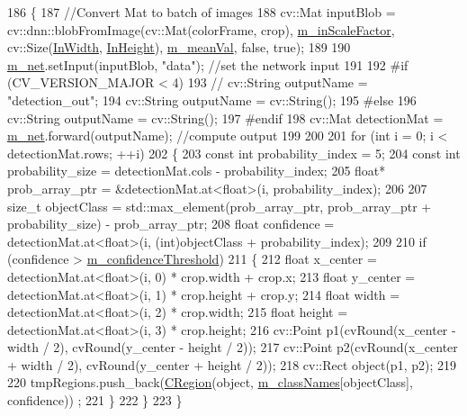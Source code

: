 \begin{DoxyCode}
186 \{
187     \textcolor{comment}{//Convert Mat to batch of images}
188     cv::Mat inputBlob = cv::dnn::blobFromImage(cv::Mat(colorFrame, crop), 
      \mbox{\hyperlink{class_yolo_detector_afc6432eab72fdf319af7f48753ecbcd1}{m\_inScaleFactor}}, cv::Size(\mbox{\hyperlink{class_yolo_detector_a01461f7ada4da3e8027d805f7129bab4}{InWidth}}, \mbox{\hyperlink{class_yolo_detector_a8511b801a9410af0b2715d4236a4b127}{InHeight}}), 
      \mbox{\hyperlink{class_yolo_detector_a126a0a3c1f91c9e6e3a878638d4b0bff}{m\_meanVal}}, \textcolor{keyword}{false}, \textcolor{keyword}{true});
189 
190     \mbox{\hyperlink{class_yolo_detector_ac5a1c603d2c9eaabf78549ca0125c1c7}{m\_net}}.setInput(inputBlob, \textcolor{stringliteral}{"data"}); \textcolor{comment}{//set the network input}
191 
192 \textcolor{preprocessor}{#if (CV\_VERSION\_MAJOR < 4)}
193     \textcolor{comment}{// cv::String outputName = "detection\_out";}
194     cv::String outputName = cv::String();
195 \textcolor{preprocessor}{#else}
196     cv::String outputName = cv::String();
197 \textcolor{preprocessor}{#endif}
198     cv::Mat detectionMat = \mbox{\hyperlink{class_yolo_detector_ac5a1c603d2c9eaabf78549ca0125c1c7}{m\_net}}.forward(outputName); \textcolor{comment}{//compute output}
199 
200 
201     \textcolor{keywordflow}{for} (\textcolor{keywordtype}{int} i = 0; i < detectionMat.rows; ++i)
202     \{
203         \textcolor{keyword}{const} \textcolor{keywordtype}{int} probability\_index = 5;
204         \textcolor{keyword}{const} \textcolor{keywordtype}{int} probability\_size = detectionMat.cols - probability\_index;
205         \textcolor{keywordtype}{float}* prob\_array\_ptr = &detectionMat.at<\textcolor{keywordtype}{float}>(i, probability\_index);
206 
207         \textcolor{keywordtype}{size\_t} objectClass = std::max\_element(prob\_array\_ptr, prob\_array\_ptr + probability\_size) - 
      prob\_array\_ptr;
208         \textcolor{keywordtype}{float} confidence = detectionMat.at<\textcolor{keywordtype}{float}>(i, (int)objectClass + probability\_index);
209 
210         \textcolor{keywordflow}{if} (confidence > \mbox{\hyperlink{class_yolo_detector_a78b57c44b28d1f817940177d197612ed}{m\_confidenceThreshold}})
211         \{
212             \textcolor{keywordtype}{float} x\_center = detectionMat.at<\textcolor{keywordtype}{float}>(i, 0) * crop.width + crop.x;
213             \textcolor{keywordtype}{float} y\_center = detectionMat.at<\textcolor{keywordtype}{float}>(i, 1) * crop.height + crop.y;
214             \textcolor{keywordtype}{float} width = detectionMat.at<\textcolor{keywordtype}{float}>(i, 2) * crop.width;
215             \textcolor{keywordtype}{float} height = detectionMat.at<\textcolor{keywordtype}{float}>(i, 3) * crop.height;
216             cv::Point p1(cvRound(x\_center - width / 2), cvRound(y\_center - height / 2));
217             cv::Point p2(cvRound(x\_center + width / 2), cvRound(y\_center + height / 2));
218             cv::Rect object(p1, p2);
219 
220             tmpRegions.push\_back(\mbox{\hyperlink{class_c_region}{CRegion}}(\textcolor{keywordtype}{object}, \mbox{\hyperlink{class_yolo_detector_aa0a06104a5778e9009ebfb0bbc6cecab}{m\_classNames}}[objectClass], confidence))
      ;
221         \}
222     \}
223 \}
\end{DoxyCode}
